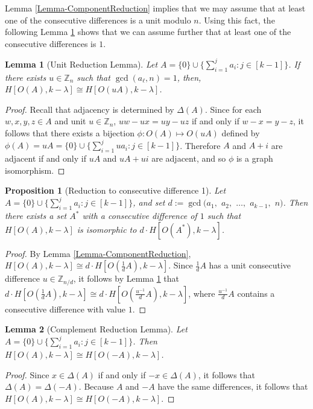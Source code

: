 \documentclass[12pt]{article}
\newcommand{\Z}{\mathbb{Z}}
\newtheorem{lem}{Lemma} %
\newtheorem{prop}[thm]{Proposition}
\theoremstyle{definition}
\begin{document}
	Lemma \ref{Lemma-ComponentReduction} implies that we may assume that at least one of the consecutive differences is a unit modulo $n$.  Using this fact, the following Lemma \ref{Lemma-UnitReduction} shows that we can assume further that at least one of the consecutive differences is $1$.
	
	\begin{lem}[Unit Reduction Lemma]\label{Lemma-UnitReduction}
		Let $A = \{0\}\cup \{\sum_{i=1}^{j}a_i:j \in [k-1]\}$.  If there exists $u \in \Z_n$ such that $\gcd(a_\ell,n) = 1$, then, $H[O(A),k-\lambda] \cong H[O(uA), k-\lambda]$.
	\end{lem}
	\begin{proof}
		Recall that adjacency is determined by $\Delta(A)$.  Since for each $w,x,y,z \in A$ and unit $u \in \Z_n$, $uw-ux = uy-uz$ if and only if $w-x=y-z$, it follows that there exists a bijection $\phi:O(A) \mapsto O(uA)$ defined by $\phi(A) = uA = \{0\}\cup \{\sum_{i=1}^{j}ua_i:j \in [k-1]\}$.  Therefore $A$ and $A+i$ are adjacent if and only if $uA$ and $uA+ui$ are adjacent, and so $\phi$ is a graph isomorphism.
	\end{proof}

	\begin{prop}[Reduction to consecutive difference 1]\label{Proposition-ReductionToConsecDiff1}
		Let $A = \{0\}\cup \{\sum_{i=1}^{j}a_i:j \in [k-1]\}$, and set $d := \gcd(a_1,$ $a_2,$ $\ldots,$ $a_{k-1},$ $n)$.  Then there exists a set $A^*$ with a consecutive difference of $1$ such that $H[O(A),k-\lambda]$ is isomorphic to $d \cdot H[O(A^*),k-\lambda]$.
	\end{prop}
	\begin{proof}
		By Lemma \ref{Lemma-ComponentReduction}, $H[O(A),k-\lambda] \cong d\cdot H[O(\tfrac{1}{d}A),k-\lambda]$.  Since $\tfrac{1}{d}A$ has a unit consecutive difference $u \in \Z_{n/d}$, it follows by Lemma \ref{Lemma-UnitReduction} that $d\cdot H[O(\tfrac{1}{d}A),k-\lambda] \cong d\cdot H[O(\tfrac{u^{-1}}{d}A), k-\lambda]$, where $\tfrac{u^{-1}}{d}A$ contains a consecutive difference with value $1$. \qedhere
	\end{proof}
	
	\begin{lem}[Complement Reduction Lemma]\label{Lemma-ComplementReductionLemma}
		Let $A = \{0\}\cup \{\sum_{i=1}^{j}a_i:j \in [k-1]\}$.  Then $H[O(A), k-\lambda] \cong H[O(-A),k-\lambda]$.
	\end{lem}
	\begin{proof}
		Since $x \in \Delta(A)$ if and only if $-x \in \Delta(A)$, it follows that $\Delta(A) = \Delta(-A)$.  Because $A$ and $-A$ have the same differences, it follows that $H[O(A), k-\lambda] \cong H[O(-A),k-\lambda]$. \qedhere
	\end{proof}
\end{document}
